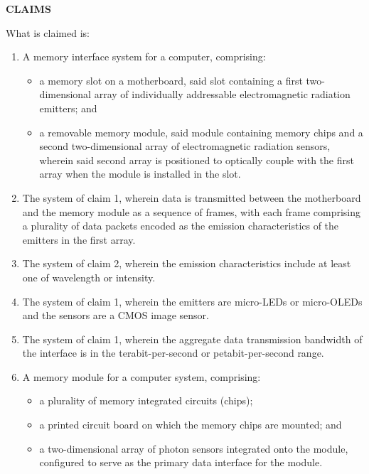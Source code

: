\documentclass[11pt,letterpaper]{article}
\begin{document}
\thispagestyle{empty}

\begin{center}
    \textbf{\large CLAIMS}
\end{center}

\vspace{0.4cm}
\noindent What is claimed is:

\begin{enumerate}[label=\textbf{\arabic*.}, leftmargin=0.5in, itemsep=0.4cm]
    \item A memory interface system for a computer, comprising:
    \begin{itemize}[leftmargin=0.3in, noitemsep]
        \item a memory slot on a motherboard, said slot containing a first two-dimensional array of individually addressable electromagnetic radiation emitters; and
        \item a removable memory module, said module containing memory chips and a second two-dimensional array of electromagnetic radiation sensors, wherein said second array is positioned to optically couple with the first array when the module is installed in the slot.
    \end{itemize}

    \item The system of claim 1, wherein data is transmitted between the motherboard and the memory module as a sequence of frames, with each frame comprising a plurality of data packets encoded as the emission characteristics of the emitters in the first array.

    \item The system of claim 2, wherein the emission characteristics include at least one of wavelength or intensity.

    \item The system of claim 1, wherein the emitters are micro-LEDs or micro-OLEDs and the sensors are a CMOS image sensor.

    \item The system of claim 1, wherein the aggregate data transmission bandwidth of the interface is in the terabit-per-second or petabit-per-second range.

    \item A memory module for a computer system, comprising:
    \begin{itemize}[leftmargin=0.3in, noitemsep]
        \item a plurality of memory integrated circuits (chips);
        \item a printed circuit board on which the memory chips are mounted; and
        \item a two-dimensional array of photon sensors integrated onto the module, configured to serve as the primary data interface for the module.
    \end{itemize}


\end{enumerate}
\end{document}
